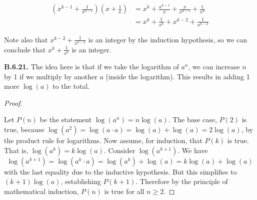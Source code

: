 \documentclass[10pt,]{book}
\theoremstyle{plain}
\theoremstyle{definition}
\theoremstyle{definition}
\theoremstyle{definition}
\theoremstyle{definition}
\numberwithin{equation}{chapter}
\newcommand{\amp}{&}
\begin{document}
\begin{align*}
\left(x^{k-1} + \frac{1}{x^{k-1}}\right)\left(x + \frac{1}{x}\right) \amp = x^k + \frac{x^{k-1}}{x} + \frac{x}{x^{k-1}} + \frac{1}{x^k}\\
\amp = x^k + \frac{1}{x^k} + x^{k-2} + \frac{1}{x^{k-2}}
\end{align*}
%
\par
\hypertarget{p-2218}{}%
Note also that \(x^{k-2} + \frac{1}{x^{k-2}}\) is an integer by the induction hypothesis, so we can conclude that \(x^k + \frac{1}{x^k}\) is an integer.%
\par\smallskip
\noindent\textbf{B.6.21.} \hypertarget{p-2222}{}%
The idea here is that if we take the logarithm of \(a^n\), we can increase \(n\) by 1 if we multiply by another \(a\) (inside the logarithm). This results in adding 1 more \(\log(a)\) to the total.%
\begin{proof}\hypertarget{proof-56}{}
\hypertarget{p-2223}{}%
Let \(P(n)\) be the statement \(\log(a^n) = n \log(a)\). The base case, \(P(2)\) is true, because \(\log(a^2) = \log(a\cdot a) = \log(a) + \log(a) = 2\log(a)\), by the product rule for logarithms. Now assume, for induction, that \(P(k)\) is true. That is, \(\log(a^k) = k\log(a)\). Consider \(\log(a^{k+1})\). We have%
\begin{equation*}
\log(a^{k+1}) = \log(a^k\cdot a) = \log(a^k) + \log(a) = k\log(a) + \log(a)
\end{equation*}
with the last equality due to the inductive hypothesis. But this simplifies to \((k+1) \log(a)\), establishing \(P(k+1)\). Therefore by the principle of mathematical induction, \(P(n)\) is true for all \(n \ge 2\).%
\end{proof}
\par\smallskip
\typeout{************************************************}
\typeout{************************************************}
\end{document}
